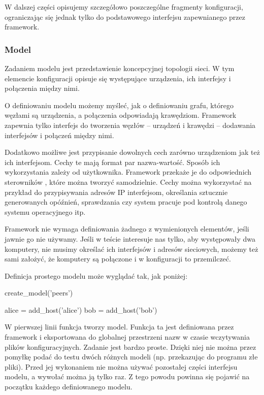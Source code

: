 \documentclass[00-praca-magisterska.tex]{subfiles}
\begin{document}
W dalszej części opisujemy szczegółowo poszczególne fragmenty konfiguracji,
ograniczając się jednak tylko do podstawowego interfejsu zapewnianego przez
framework. 

\subsubsection{Model}

Zadaniem modelu jest przedstawienie koncepcyjnej topologii sieci. W tym
elemencie konfiguracji opisuje się występujące urządzenia, ich interfejsy i
połączenia między nimi.

O definiowaniu modelu możemy myśleć, jak o definiowaniu grafu, którego węzłami
są urządzenia, a połączenia odpowiadają krawędziom. Framework zapewnia tylko
interfejs do tworzenia węzłów -- urządzeń i krawędzi -- dodawania interfejsów
i połączeń między nimi.

Dodatkowo możliwe jest przypisanie dowolnych cech zarówno urządzeniom jak też
ich interfejsom. Cechy te mają format par nazwa-wartość. Sposób ich
wykorzystania zależy od użytkownika. Framework przekaże je do odpowiednich
sterowników , które można
tworzyć samodzielnie. Cechy można wykorzystać na przykład do przypisywania
adresów IP interfejsom, określania sztucznie generowanych opóźnień,
sprawdzania czy system pracuje pod kontrolą danego systemu operacyjnego itp.

Framework nie wymaga definiowania żadnego z wymienionych elementów, jeśli
jawnie go nie używamy. Jeśli w teście interesuje nas tylko, aby występowały
dwa komputery, nie musimy określać ich interfejsów i adresów sieciowych,
możemy też sami założyć, że komputery są połączone i w konfiguracji to
przemilczeć.

Definicja prostego modelu może wyglądać tak, jak poniżej:

\begin{pythoncode}
  create_model('peers')

  alice = add_host('alice')
  bob   = add_host('bob')
\end{pythoncode}

W pierwszej linii funkcja  tworzy model. Funkcja ta jest
definiowana przez framework i eksportowana do globalnej przestrzeni nazw w
czasie wczytywania plików konfiguracyjnych. Zadanie  jest
bardzo proste. Dzięki niej nie można przez pomyłkę podać do testu dwóch
różnych modeli (np. przekazując do programu złe pliki). Przed jej wykonaniem
nie można używać pozostałej części interfejsu modelu, a wywołać można ją tylko
raz. Z tego powodu powinna się pojawić na początku każdego definiowanego
modelu.
\end{document}

